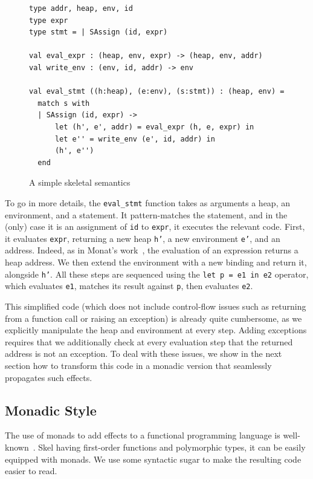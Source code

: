 \documentclass[submission,copyright,creativecommons]{eptcs}
\newcommand{\skinl}[1]{\texttt{#1}}
\begin{document}
\begin{figure}
\centering
\begin{minipage}{0.8\textwidth}
\begin{verbatim}
type addr, heap, env, id
type expr
type stmt = | SAssign (id, expr)

val eval_expr : (heap, env, expr) -> (heap, env, addr)
val write_env : (env, id, addr) -> env

val eval_stmt ((h:heap), (e:env), (s:stmt)) : (heap, env) =
  match s with
  | SAssign (id, expr) ->
      let (h', e', addr) = eval_expr (h, e, expr) in
      let e'' = write_env (e', id, addr) in
      (h', e'')
  end
\end{verbatim}
\end{minipage}
\caption{\label{fig:simpleskel}A simple skeletal semantics}
\end{figure}

To go in more details, the \skinl{eval_stmt} function takes as arguments a heap, an
environment, and a statement. It pattern-matches the statement, and in the
(only) case it is an assignment of \skinl{id} to \skinl{expr}, it executes the
relevant code. First, it evaluates \skinl{expr}, returning a new heap
\skinl{h'}, a new environment \skinl{e'}, and an address. Indeed, as in Monat's
work~\cite{Monat2021}, the evaluation of an expression returns a heap address.
We then extend the environment with a new binding and return it, alongside
\skinl{h'}. All these steps are sequenced using the \skinl{let p = e1 in e2}
operator, which evaluates \skinl{e1}, matches its result against \skinl{p}, then
evaluates \skinl{e2}.

This simplified code (which does not include control-flow issues such as
returning from a function call or raising an exception) is already quite cumbersome, as
we explicitly manipulate the heap and environment at every step. Adding
exceptions requires that we additionally check at every evaluation step that the returned
address is not an exception. To deal with these issues, we show in the next section how to transform
this code in a monadic version that seamlessly propagates such effects.

\subsection{Monadic Style}
The use of monads to add effects to a functional programming language is
well-known~\cite{Wadler1990}. Skel having first-order functions and polymorphic
types, it can be easily equipped with monads. We use some syntactic sugar to
make the resulting code easier to read.
\end{document}
